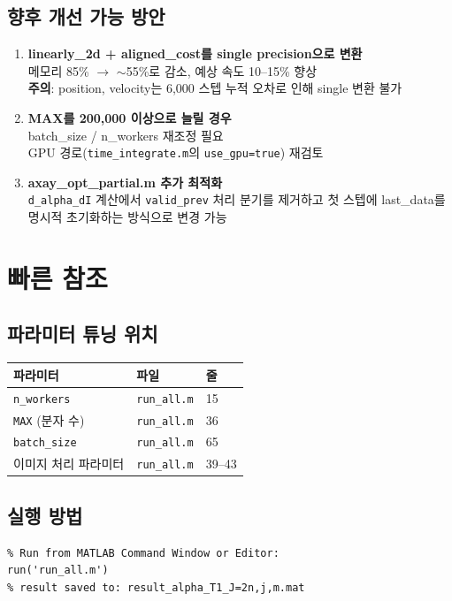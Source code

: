 \documentclass[11pt, a4paper]{article}
\begin{document}
\subsection{향후 개선 가능 방안}

\begin{enumerate}[itemsep=4pt]
  \item \textbf{linearly\_2d + aligned\_cost를 single precision으로 변환}\\
        메모리 85\% $\to$ $\sim$55\%로 감소, 예상 속도 10--15\% 향상\\
        \textbf{주의}: position, velocity는 6,000 스텝 누적 오차로 인해 single 변환 불가

  \item \textbf{MAX를 200,000 이상으로 늘릴 경우}\\
        batch\_size / n\_workers 재조정 필요\\
        GPU 경로(\texttt{time\_integrate.m}의 \texttt{use\_gpu=true}) 재검토

  \item \textbf{axay\_opt\_partial.m 추가 최적화}\\
        \texttt{d\_alpha\_dI} 계산에서 \texttt{valid\_prev} 처리 분기를 제거하고
        첫 스텝에 last\_data를 명시적 초기화하는 방식으로 변경 가능
\end{enumerate}

\section{빠른 참조}

\subsection{파라미터 튜닝 위치}

\begin{center}
\begin{tabular}{lll}
\toprule
파라미터 & 파일 & 줄 \\
\midrule
\texttt{n\_workers} & \texttt{run\_all.m} & 15 \\
\texttt{MAX} (분자 수) & \texttt{run\_all.m} & 36 \\
\texttt{batch\_size} & \texttt{run\_all.m} & 65 \\
이미지 처리 파라미터 & \texttt{run\_all.m} & 39--43 \\
\bottomrule
\end{tabular}
\end{center}

\subsection{실행 방법}

\begin{lstlisting}
% Run from MATLAB Command Window or Editor:
run('run_all.m')
% result saved to: result_alpha_T1_J=2n,j,m.mat
\end{lstlisting}
\end{document}
